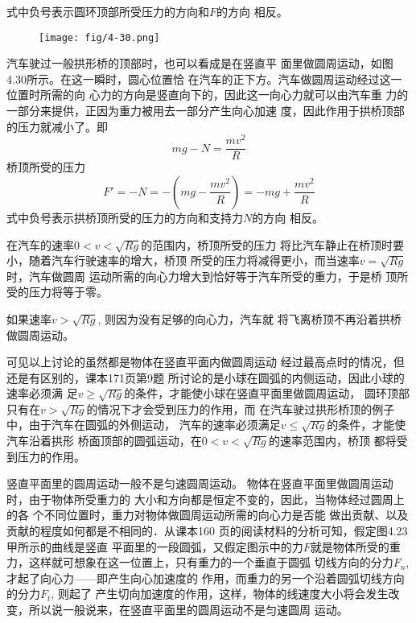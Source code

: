 式中负号表示圆环顶部所受压力的方向和$F$的方向
相反。

\begin{figure}[htp]
    \centering
    \texttt{[image: fig/4-30.png]}
    \caption{}
\end{figure}

汽车驶过一般拱形桥的顶部时，也可以看成是在竖直平
面里做圆周运动，如图4.30所示。在这一瞬时，圆心位置恰
在汽车的正下方。汽车做圆周运动经过这一位置时所需的向
心力的方向是竖直向下的，因此这一向心力就可以由汽车重
力的一部分来提供，正因为重力被用去一部分产生向心加速
度，因此作用于拱桥顶部的压力就减小了。即
\[mg-N=\frac{mv^2}{R}\]
桥顶所受的压力
\[F'=-N=-\left(mg-\frac{mv^2}{R}\right)=-mg+\frac{mv^2}{R}\]
式中负号表示拱桥顶所受的压力的方向和支持力$N$的方向
相反。

在汽车的速率$0<v<\sqrt{Rg}$的范围内，桥顶所受的压力
将比汽车静止在桥顶时要小，随着汽车行驶速率的增大，桥顶
所受的压力将减得更小，而当速率$v=\sqrt{Rg}$时，汽车做圆周
运动所需的向心力增大到恰好等于汽车所受的重力，于是桥
顶所受的压力将等于零。

如果速率$v>\sqrt{Rg}$, 则因为没有足够的向心力，汽车就
将飞离桥顶不再沿着拱桥做圆周运动。

可见以上讨论的虽然都是物体在竖直平面内做圆周运动
经过最高点时的情况，但还是有区别的，课本171页第9题
所讨论的是小球在圆弧的内侧运动，因此小球的速率必须满
足$v\ge \sqrt{Rg}$的条件，才能使小球在竖直平面里做圆周运动，
圆环顶部只有在$v>\sqrt{Rg}$的情况下才会受到压力的作用，而
在汽车驶过拱形桥顶的例子中，由于汽车在圆弧的外侧运动，
汽车的速率必须满足$v\le \sqrt{Rg}$的条件，才能使汽车沿着拱形
桥面顶部的圆弧运动，在$0<v<\sqrt{Rg}$的速率范围内，桥顶
都将受到压力的作用。

竖直平面里的圆周运动一般不是匀速圆周运动。
物体在竖直平面里做圆周运动时，由于物体所受重力的
大小和方向都是恒定不变的，因此，当物体经过圆周上的各
个不同位置时，重力对物体做圆周运动所需的向心力是否能
做出贡献、以及贡献的程度如何都是不相同的．从课本160
页的阅读材料的分析可知，假定图4.23甲所示的曲线是竖直
平面里的一段圆弧，又假定图示中的力$F$就是物体所受的重
力，这样就可想象在这一位置上，只有重力的一个垂直于圆弧
切线方向的分力$F_n$, 才起了向心力——即产生向心加速度的
作用，而重力的另一个沿着圆弧切线方向的分力$F_t$, 则起了
产生切向加速度的作用，这样，物体的线速度大小将会发生改
变，所以说一般说来，在竖直平面里的圆周运动不是匀速圆周
运动。

